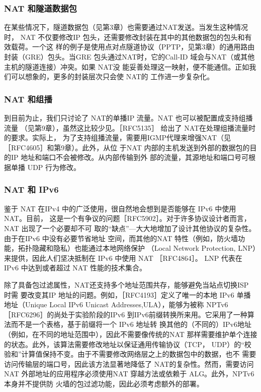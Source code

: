 \subsubsection{NAT 和隧道数据包}

在某些情况下，隧道数据包（见第3章）也需要通过NAT发送。当发生这种情况时，
NAT 不仅要修改IP 包头，还需要修改封装在其中的其他数据包的包头和有效载荷。一个这
样的例子是使用点对点隧道协议（PPTP，见第3章）的通用路由封装（GRE）包头。当GRE
包头通过NAT时，它的Call-ID 域会与NAT（或其他主机的隧道连接）冲突。如果 NAT没
能妥善处理这一映射，便不能通信。正如我们可以想象的，更多的封装层次只会使 NAT的
工作进一步复杂化。

\subsubsection{ NAT 和组播}

到目前为止，我们只讨论了 NAT的单播IP 流量。NAT 也可以被配置成支持组播流量
（见第9章），虽然这比较少见。［RFC5135］ 给出了 NAT在处理组播流量时的要求。实际上，
为了支持组播流量，需要用IGMP代理来增强NAT（见［RFC4605］和第9章）。此外，从位
于NAT 内部的主机发送到外部的数据包的目的IP 地址和端口不会被修改。从内部传输到外
部的流量，其源地址和端口号可根据单播 UDP 行为修改。

\subsubsection{NAT 和 IPv6}

鉴于 NAT 在IPv4 中的广泛使用，很自然地会想到是否能够在 IPv6 中使用 NAT。目前，
这是一个有争议的问题［RFC5902］。对于许多协议设计者而言，NAT 出现了一个必要却不可
取的“缺点”—大大地增加了设计其他协议的复杂性。由于在IPv6 中没有必要节省地址
空间，而其他的NAT 特性（例如，防火墙功能，拓扑隐藏和隐私）也能通过本地网络保护
（Local Network Protection, LNP）来提供，因此人们坚决抵制在 IPv6 中使用 NAT ［RFC4864］。
LNP 代表在 IPv6 中达到或者超过 NAT 性能的技术集合。

除了具备包过滤属性，NAT还支持多个地址范围共存，能够避免当站点切换ISP 时需
要改变其IP 地址的问题。例如，［RFC4193］定义了唯一的本地 IPv6 单播地址（Unique Local
IPv6 Unicast Addresses,ULA），能够为被称 NPTv6［RFC6296］的尚处于实验阶段的IPv6
到IPv6前缀转换所来用。它采用了一种算法而不是一个表格，基于前缀将一个 IPv6 地址转
换其他的（不同的）IPv6地址（例如，在不同的地址范围中），因此不需要像传统的NAT
那样需要维护单个连接的状态。此外，该算法需要修改地址以保证通用传输协议（TCP，
UDP）的“校验和”计算值保持不变。由于不需要修改网络层之上的数据包中的数据，也不
需要访问传输层的端口号，因此该方法显著地降低了 NAT的复杂性。然而，需要访问 NAT
外部地址的应用程序必须使用NAT 穿越方法或依赖于 ALG。此外，NPTv6 本身并不提供防
火墙的包过滤功能，因此必须考虑额外的部署。

